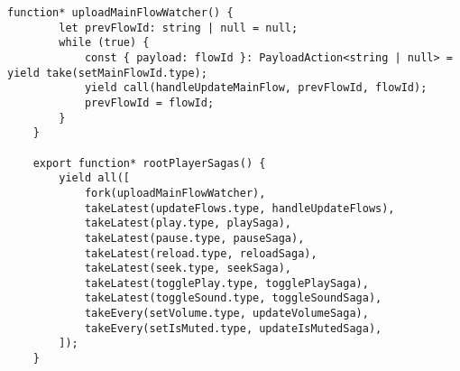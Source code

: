 \begin{lstlisting}[caption={shared/player-sagas.ts}]
	function* uploadMainFlowWatcher() {
		let prevFlowId: string | null = null;
		while (true) {
			const { payload: flowId }: PayloadAction<string | null> = yield take(setMainFlowId.type);
			yield call(handleUpdateMainFlow, prevFlowId, flowId);
			prevFlowId = flowId;
		}
	}
	
	export function* rootPlayerSagas() {
		yield all([
			fork(uploadMainFlowWatcher),
			takeLatest(updateFlows.type, handleUpdateFlows),
			takeLatest(play.type, playSaga),
			takeLatest(pause.type, pauseSaga),
			takeLatest(reload.type, reloadSaga),
			takeLatest(seek.type, seekSaga),
			takeLatest(togglePlay.type, togglePlaySaga),
			takeLatest(toggleSound.type, toggleSoundSaga),
			takeEvery(setVolume.type, updateVolumeSaga),
			takeEvery(setIsMuted.type, updateIsMutedSaga),
		]);
	}
\end{lstlisting}

